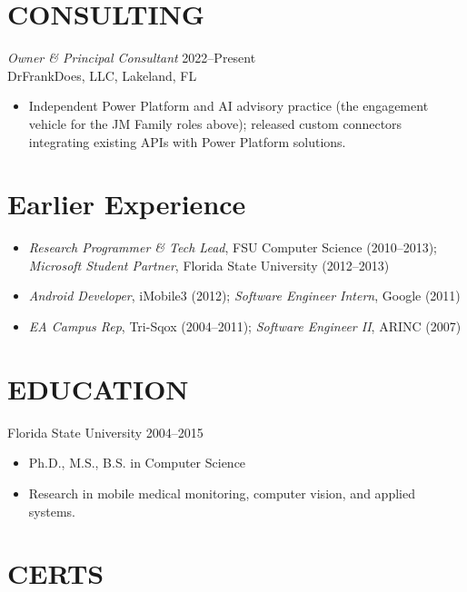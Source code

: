 \documentclass[margin]{res}
\begin{document}
\begin{resume}
\section{CONSULTING}
{\sl Owner \& Principal Consultant} \hfill 2022--Present\\
DrFrankDoes, LLC, Lakeland, FL
\begin{itemize}
\item Independent Power Platform and AI advisory practice (the engagement vehicle for the JM Family roles above); released custom connectors integrating existing APIs with Power Platform solutions.
\end{itemize}

\section{Earlier Experience}
\begin{itemize}[itemsep=-2pt]
  \item \textit{Research Programmer \& Tech Lead}, FSU Computer Science (2010–2013); \textit{Microsoft Student Partner}, Florida State University (2012–2013)
  \item \textit{Android Developer}, iMobile3 (2012); \textit{Software Engineer Intern}, Google (2011)
  \item \textit{EA Campus Rep}, Tri-Sqox (2004–2011); \textit{Software Engineer II}, ARINC (2007)
\end{itemize}

\section{EDUCATION}
Florida State University \hfill 2004--2015
\begin{itemize}
\item Ph.D., M.S., B.S. in Computer Science
\item Research in mobile medical monitoring, computer vision, and applied systems.
\end{itemize}

\section{CERTS}

\newcommand\x{\includegraphics[height=1.1cm]}


\end{resume}
\end{document}
